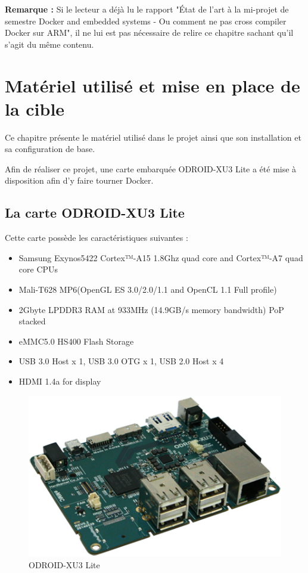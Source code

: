 \documentclass[11pt,a4paper,oneside]{report}
\newcommand{\oldreportname}{État de l’art à la mi-projet de semestre Docker and embedded systems - Ou comment ne pas cross compiler Docker sur ARM}
\newcommand{\odroid}{ODROID-XU3 Lite }
\begin{document}
\textbf{Remarque : } Si le lecteur a déjà lu le rapport "\oldreportname", il ne lui est pas nécessaire de relire ce chapitre sachant qu'il s'agit du même contenu.



\chapter{Matériel utilisé et mise en place de la cible}

Ce chapitre présente le matériel utilisé dans le projet ainsi que son installation et sa configuration de base.

Afin de réaliser ce projet, une carte embarquée \odroid a été mise à disposition afin d'y faire tourner Docker.

\section{La carte \odroid}

Cette carte possède les caractéristiques suivantes \cite{hardkernel_odroid_xu3}:

\begin{itemize}
\item Samsung Exynos5422 Cortex™-A15 1.8Ghz quad core and Cortex™-A7 quad core CPUs
\item Mali-T628 MP6(OpenGL ES 3.0/2.0/1.1 and OpenCL 1.1 Full profile)
\item 2Gbyte LPDDR3 RAM at 933MHz (14.9GB/s memory bandwidth) PoP stacked
\item eMMC5.0 HS400 Flash Storage
\item USB 3.0 Host x 1, USB 3.0 OTG x 1, USB 2.0 Host x 4
\item HDMI 1.4a for display
\end{itemize}

\begin{figure}[hbtp]
\centering
\includegraphics[scale=0.5]{img/ODROIDXU3Lite.jpg}
\caption{\odroid}
\end{figure}
\end{document}
